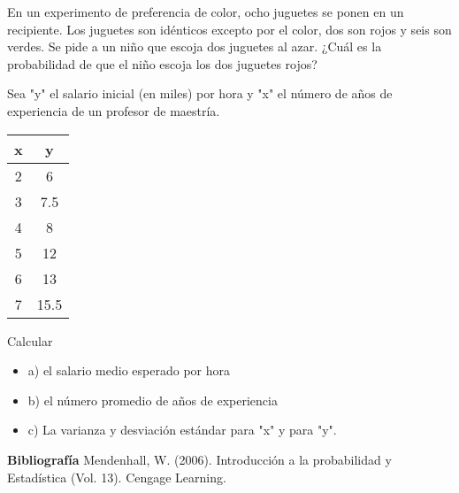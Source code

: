 \documentclass{oxmathproblems}
\begin{document}
\begin{questions}
\miquestion En un experimento de preferencia de color, ocho juguetes se ponen en un recipiente. Los juguetes son idénticos excepto por el color, dos son rojos y seis son verdes. Se pide a un niño que escoja dos juguetes al azar. ¿Cuál es la probabilidad de que el niño escoja los dos juguetes rojos?

\miquestion Sea "y" el salario inicial (en miles) por hora y "x" el número de años de experiencia de un profesor de maestría. 
\begin{center}
\begin{tabular}{ |c|c| } 
 \hline
 \textbf{x} & \textbf{y} \\ 
 \hline
 2 & 6 \\
 3  & 7.5 \\
4 & 8\\ 
5 & 12 \\ 
6 & 13 \\ 
7 & 15.5 \\ 
 \hline
\end{tabular}
\end{center}
Calcular   
\begin{itemize}
\item  a) el salario medio esperado por hora
\item  b) el número promedio de años de experiencia 
\item  c) La varianza y desviación estándar para "x" y para "y". 
\end{itemize}

\end{questions}

\textbf{Bibliografía}
Mendenhall, W. (2006). Introducción a la probabilidad y Estadística (Vol. 13). Cengage Learning.
\end{document}
